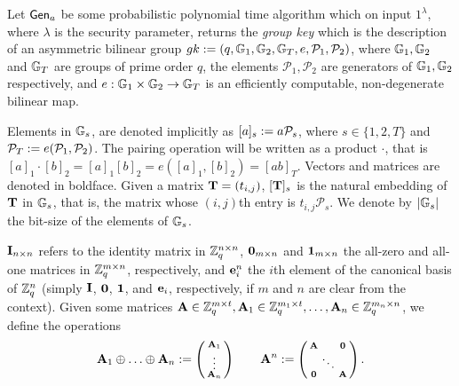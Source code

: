 Let $\mathsf{Gen}_a$ be some probabilistic polynomial time algorithm which on input $1^{\lambda}$, where $\lambda$ is the security parameter, returns the \emph{group key} which is the description of an asymmetric bilinear group $gk:=(q,\mathbb{G}_1,\mathbb{G}_2,\mathbb{G}_T,e,\mathcal{P}_1,\mathcal{P}_2)$, where $\mathbb{G}_1,\mathbb{G}_2$
and $\mathbb{G}_T$ are groups of prime order $q$, the elements $\mathcal{P}_1, \mathcal{P}_2$ are generators of 
$\mathbb{G}_1,\mathbb{G}_2$ respectively, and $e:\mathbb{G}_1\times\mathbb{G}_2\to\mathbb{G}_T$ is an efficiently
computable, non-degenerate bilinear map. 

Elements in $\mathbb{G}_s$, are denoted implicitly as $[a]_s:=a \mathcal{P}_s$, where $s \in \{1,2,T\}$ and $\mathcal{P}_T:=e(\mathcal{P}_1,\mathcal{P}_2)$. 
The pairing operation will be written as a product $\cdot$, that is $[a]_1 \cdot [b]_2=[a]_1 [b]_2=e([a]_1,[b]_2)=[ab]_T$. Vectors and matrices are denoted in boldface. Given a matrix $\mathbf{{T}}=(t_{i,j})$, $[\mathbf{{T}}]_s$ is
the natural embedding of $\mathbf{{T}}$ in $\mathbb{G}_s$, that is, the matrix whose $(i,j)$th entry
is $t_{i,j}\mathcal{P}_s$. We denote by $|\mathbb{G}_s|$ the bit-size of the elements of $\mathbb{G}_s$.

$\mathbf{{I}}_{n\times n}$ refers to the identity matrix in $\mathbb{Z}_q^{n\times n}$, $\mathbf{{0}}_{m\times n}$ and $\mathbf{{1}}_{m\times n}$ the all-zero and all-one matrices in $\mathbb{Z}_q^{m\times n}$, respectively, and $\mathbf{e}^{n}_i$ the $i$th element 
of the canonical basis of $\mathbb{Z}_q^{n}$ (simply $\mathbf{{I}}$, $\mathbf{{0}}$, $\mathbf{{1}}$, and $\mathbf{e}_i$, respectively, if $m$ and $n$ are clear from the context). 
Given some matrices $\mathbf{{A}}\in\mathbb{Z}_q^{m\times t},\mathbf{{A}}_1\in\mathbb{Z}_q^{m_1\times t},\ldots,\mathbf{{A}}_n\in\mathbb{Z}_q^{m_n\times n}$, we define the operations $$\mathbf{A}_1 \oplus \ldots \oplus \mathbf{A}_n:=\left(\begin{smallmatrix} \mathbf{A}_1 \\ \vdots \\  \mathbf{A}_n\end{smallmatrix}\right) \qquad 
\mathbf{{A}}^n:=\left(\begin{smallmatrix} \mathbf{{A}} &  & \mathbf{{0}} \\   & \ddots &   \\ \mathbf{{0}} &  & \mathbf{{A}}
\end{smallmatrix}\right).$$ 

